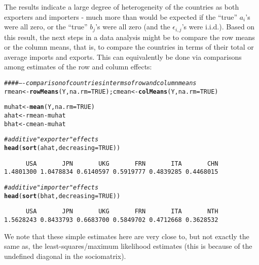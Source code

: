 \documentclass[11pt]{article}\usepackage[]{graphicx}\usepackage[]{color}
\makeatletter
\newcommand{\hlnum}[1]{\textcolor[rgb]{0.686,0.059,0.569}{#1}}%
\newcommand{\hlcom}[1]{\textcolor[rgb]{0.678,0.584,0.686}{\textit{#1}}}%
\newcommand{\hlopt}[1]{\textcolor[rgb]{0,0,0}{#1}}%
\newcommand{\hlstd}[1]{\textcolor[rgb]{0.345,0.345,0.345}{#1}}%
\newcommand{\hlkwb}[1]{\textcolor[rgb]{0.69,0.353,0.396}{#1}}%
\newcommand{\hlkwc}[1]{\textcolor[rgb]{0.333,0.667,0.333}{#1}}%
\newcommand{\hlkwd}[1]{\textcolor[rgb]{0.737,0.353,0.396}{\textbf{#1}}}%
\newenvironment{kframe}{%
 \def\at@end@of@kframe{}%
 \ifinner\ifhmode%
  \def\at@end@of@kframe{\end{minipage}}%
  \begin{minipage}{\columnwidth}%
 \fi\fi%
 \def\FrameCommand##1{\hskip\@totalleftmargin \hskip-\fboxsep
 \colorbox{shadecolor}{##1}\hskip-\fboxsep
     \hskip-\linewidth \hskip-\@totalleftmargin \hskip\columnwidth}%
 \MakeFramed {\advance\hsize-\width
   \@totalleftmargin\z@ \linewidth\hsize
   \@setminipage}}%
 {\par\unskip\endMakeFramed%
 \at@end@of@kframe}
\newenvironment{knitrout}{}{} %
\makeatother
\begin{document}
The results indicate a large degree of heterogeneity 
of the 
countries as both exporters and importers - much more than 
would be expected if the ``true'' $a_i$'s were all zero, 
or the ``true'' $b_j$'s were all zero  (and the 
$\epsilon_{i,j}$'s were i.i.d.). 
Based on this result, the next steps in a data analysis might be 
to compare the row means or the column means, that is, 
to compare the countries in terms of their total or average 
imports and exports. This can equivalently be done via 
comparisons among estimates of the row and column effects:
\begin{knitrout}\footnotesize
{}\color{fgcolor}\begin{kframe}
\begin{alltt}
\hlcom{#### ---- comparison of countries in terms of row and column means}
\hlstd{rmean}\hlkwb{<-}\hlkwd{rowMeans}\hlstd{(Y,}\hlkwc{na.rm}\hlstd{=}\hlnum{TRUE}\hlstd{) ; cmean}\hlkwb{<-}\hlkwd{colMeans}\hlstd{(Y,}\hlkwc{na.rm}\hlstd{=}\hlnum{TRUE}\hlstd{)}

\hlstd{muhat}\hlkwb{<-}\hlkwd{mean}\hlstd{(Y,}\hlkwc{na.rm}\hlstd{=}\hlnum{TRUE}\hlstd{)}
\hlstd{ahat}\hlkwb{<-}\hlstd{rmean}\hlopt{-}\hlstd{muhat}
\hlstd{bhat}\hlkwb{<-}\hlstd{cmean}\hlopt{-}\hlstd{muhat}

\hlcom{# additive "exporter" effects}
\hlkwd{head}\hlstd{(} \hlkwd{sort}\hlstd{(ahat,}\hlkwc{decreasing}\hlstd{=}\hlnum{TRUE}\hlstd{)  )}
\end{alltt}
\begin{verbatim}
      USA       JPN       UKG       FRN       ITA       CHN 
1.4801300 1.0478834 0.6140597 0.5919777 0.4839285 0.4468015 
\end{verbatim}
\begin{alltt}
\hlcom{# additive "importer" effects}
\hlkwd{head}\hlstd{(} \hlkwd{sort}\hlstd{(bhat,}\hlkwc{decreasing}\hlstd{=}\hlnum{TRUE}\hlstd{)  )}
\end{alltt}
\begin{verbatim}
      USA       JPN       UKG       FRN       ITA       NTH 
1.5628243 0.8433793 0.6683700 0.5849702 0.4712668 0.3628532 
\end{verbatim}
\end{kframe}
\end{knitrout}
We note that these simple estimates here are 
very close to, but not exactly 
the same as, the least-squares/maximum likelihood estimates
(this is because of the undefined diagonal in the sociomatrix). 
\end{document}
